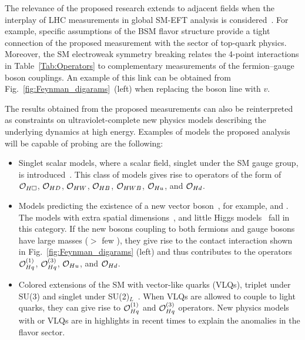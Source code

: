 \documentclass[a4paper,11pt]{article}
\begin{document}
The relevance of the proposed research extends to adjacent fields when the interplay of LHC measurements in global SM-EFT analysis is considered~\cite{Ellis:2018gqa,Ethier:2021bye}.
For example, specific assumptions of the BSM flavor structure provide a tight connection of the proposed measurement with the sector of top-quark physics. 
Moreover, the SM electroweak symmetry breaking relates the 4-point interactions in Table~\ref{Tab:Operators} to complementary measurements of the fermion--gauge boson couplings. 
An example of this link can be obtained from Fig.~\ref{fig:Feynman_digarams}~(left) when replacing the \PH boson line with $v$.

The results obtained from the proposed measurements can also be reinterpreted as constraints on ultraviolet-complete new physics models describing the underlying dynamics at high energy.
Examples of models the proposed analysis will be capable of probing are the following:
\begin{itemize}

\item Singlet scalar models, where a scalar field, singlet under the SM gauge group, is introduced~\cite{deBlas:2014mba,Profumo:2014opa}. This class of models gives rise to operators of the form of ${\cal O}_{H\square}$, ${\cal O}_{HD}$, ${\cal O}_{HW}$, ${\cal O}_{HB}$, ${\cal O}_{HWB}$, ${\cal O}_{Hu}$, and ${\cal O}_{Hd}$.

\item Models predicting the existence of a new vector boson~\cite{delAguila:2010mx}, for example, \PZprime and \PWprime. 
The models with extra spatial dimensions~\cite{Burdman:2006gy}, and little Higgs models~\cite{PhysRevD.10.275} fall in this category.
If the new bosons coupling to both fermions and gauge bosons have large masses ($>$ few \TeV), they give rise to the contact interaction shown in Fig.~\ref{fig:Feynman_digarams} (left) and thus contributes to the operators  ${\cal O}^{(1)}_{Hq}$, ${\cal O}^{(3)}_{Hq}$, ${\cal O}_{Hu}$, and ${\cal O}_{Hd}$. 

\item Colored extensions of the SM with vector-like quarks (VLQs), triplet under SU(3) and singlet under SU(2)$_L$~\cite{delAguila:2000aa,Dawson:2012di}. 
When VLQs are allowed to couple to light quarks, they can give rise to ${\cal O}^{(1)}_{Hq}$ and ${\cal O}^{(3)}_{Hq}$ operators.
New physics models with \PZprime or VLQs are in highlights in recent times to explain the anomalies in the flavor sector. 

\end{itemize}
\end{document}
